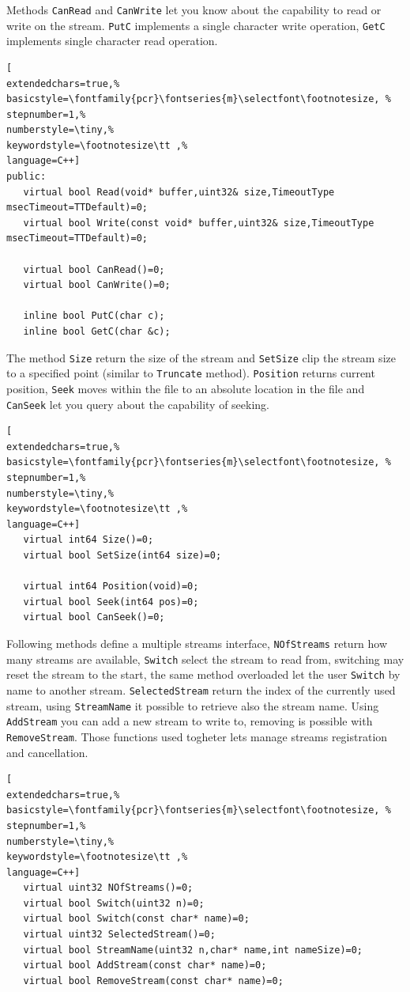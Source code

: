 Methods \texttt{CanRead} and \texttt{CanWrite} let you know about the capability to read or write on the stream. \texttt{PutC} implements a single character write operation, \texttt{GetC} implements single character read operation.

\begin{lstlisting}[
extendedchars=true,%
basicstyle=\fontfamily{pcr}\fontseries{m}\selectfont\footnotesize, %
stepnumber=1,%
numberstyle=\tiny,%
keywordstyle=\footnotesize\tt ,%
language=C++]
public:
   virtual bool Read(void* buffer,uint32& size,TimeoutType msecTimeout=TTDefault)=0;
   virtual bool Write(const void* buffer,uint32& size,TimeoutType msecTimeout=TTDefault)=0;

   virtual bool CanRead()=0;
   virtual bool CanWrite()=0;

   inline bool PutC(char c);
   inline bool GetC(char &c);
\end{lstlisting}

The method \texttt{Size} return the size of the stream and \texttt{SetSize} clip the stream size to a specified point (similar to \texttt{Truncate} method). \texttt{Position} returns current position, \texttt{Seek} moves within the file to an absolute location in the file and \texttt{CanSeek} let you query about the capability of seeking.

\begin{lstlisting}[
extendedchars=true,%
basicstyle=\fontfamily{pcr}\fontseries{m}\selectfont\footnotesize, %
stepnumber=1,%
numberstyle=\tiny,%
keywordstyle=\footnotesize\tt ,%
language=C++]
   virtual int64 Size()=0;
   virtual bool SetSize(int64 size)=0;

   virtual int64 Position(void)=0;
   virtual bool Seek(int64 pos)=0;
   virtual bool CanSeek()=0;
\end{lstlisting}

Following methods define a multiple streams interface, \texttt{NOfStreams} return how many streams are available, \texttt{Switch} select the stream to read from, switching may reset the stream to the start, the same method overloaded let the user \texttt{Switch} by name to another stream. \texttt{SelectedStream} return the index of the currently used stream, using \texttt{StreamName} it possible to retrieve also the stream name. Using \texttt{AddStream} you can add a new stream to write to, removing is possible with \texttt{RemoveStream}. Those functions used togheter lets manage streams registration and cancellation.

\begin{lstlisting}[
extendedchars=true,%
basicstyle=\fontfamily{pcr}\fontseries{m}\selectfont\footnotesize, %
stepnumber=1,%
numberstyle=\tiny,%
keywordstyle=\footnotesize\tt ,%
language=C++]
   virtual uint32 NOfStreams()=0;
   virtual bool Switch(uint32 n)=0;
   virtual bool Switch(const char* name)=0;
   virtual uint32 SelectedStream()=0;
   virtual bool StreamName(uint32 n,char* name,int nameSize)=0;
   virtual bool AddStream(const char* name)=0;
   virtual bool RemoveStream(const char* name)=0;
\end{lstlisting}

